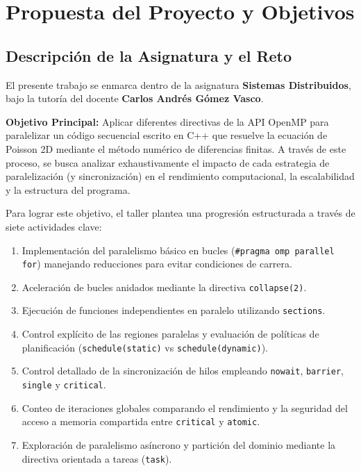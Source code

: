 
\usepackage{listings}
\usepackage{graphicx}
\usepackage{ragged2e}




\section{Propuesta del Proyecto y Objetivos}

\subsection{Descripción de la Asignatura y el Reto}
El presente trabajo se enmarca dentro de la asignatura \textbf{Sistemas Distribuidos}, bajo la tutoría del docente \textbf{Carlos Andrés Gómez Vasco}. 

\textbf{Objetivo Principal:} 
Aplicar diferentes directivas de la API OpenMP para paralelizar un código secuencial escrito en C++ que resuelve la ecuación de Poisson 2D mediante el método numérico de diferencias finitas. A través de este proceso, se busca analizar exhaustivamente el impacto de cada estrategia de paralelización (y sincronización) en el rendimiento computacional, la escalabilidad y la estructura del programa.

Para lograr este objetivo, el taller plantea una progresión estructurada a través de siete actividades clave:
\begin{enumerate}
    \item Implementación del paralelismo básico en bucles (\texttt{\#pragma omp parallel for}) manejando reducciones para evitar condiciones de carrera.
    \item Aceleración de bucles anidados mediante la directiva \texttt{collapse(2)}.
    \item Ejecución de funciones independientes en paralelo utilizando \texttt{sections}.
    \item Control explícito de las regiones paralelas y evaluación de políticas de planificación (\texttt{schedule(static)} vs \texttt{schedule(dynamic)}).
    \item Control detallado de la sincronización de hilos empleando \texttt{nowait}, \texttt{barrier}, \texttt{single} y \texttt{critical}.
    \item Conteo de iteraciones globales comparando el rendimiento y la seguridad del acceso a memoria compartida entre \texttt{critical} y \texttt{atomic}.
    \item Exploración de paralelismo asíncrono y partición del dominio mediante la directiva orientada a tareas (\texttt{task}).
\end{enumerate}

